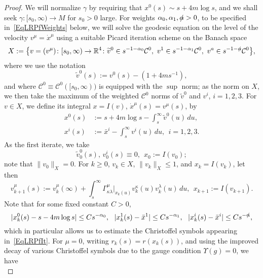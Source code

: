 \documentclass[reqno,11pt,letterpaper]{amsart}
\numberwithin{equation}{section}
\numberwithin{figure}{section}
\theoremstyle{definition}
\theoremstyle{remark}
\newcommand{\mc}{\mathcal}
\newcommand{\cC}{\mc C}
\newcommand{\R}{\mathbb{R}}
\newcommand{\slalpha}{\slashed{\alpha}{}}
\newcommand{\Ups}{\Upsilon}
\newcommand{\wt}{\widetilde}
\begin{document}
\begin{proof}
  We will normalize $\gamma$ by requiring that $x^0(s)\sim s+4 m\log s$, and we shall seek $\gamma\colon[s_0,\infty)\to M$ for $s_0>0$ large. For weights $\alpha_0,\alpha_1,\slalpha>0$, to be specified in~\eqref{EqLRPfWeights} below, we will solve the geodesic equation on the level of the velocity $v^\mu=\dot x^\mu$ using a suitable Picard iteration scheme on the Banach space
  \begin{equation}
  \label{EqLRPfBanach}
    X := \bigl\{ v=(v^\mu)\colon[s_0,\infty)\to\R^4 \colon \wt v^0 \in s^{-1-\alpha_0}\cC^0,\ v^1 \in s^{-1-\alpha_1}\cC^0,\ v^a \in s^{-1-\slalpha}\cC^0 \bigr\},
  \end{equation}
  where we use the notation
  \[
    \wt v^0(s):=v^0(s)-(1+4 m s^{-1}),
  \]
  and where $\cC^0\equiv\cC^0([s_0,\infty))$ is equipped with the $\sup$ norm; as the norm on $X$, we then take the maximum of the weighted $\cC^0$ norms of $\wt v^0$ and $v^i$, $i=1,2,3$. For $v\in X$, we define its integral $x=I(v)$, $\dot x^\mu(s)=v^\mu(s)$, by
  \begin{equation}
  \label{EqLRPfx}
  \begin{split}
    x^0(s) &:= s+4 m\log s - \int_s^\infty \wt v^0(u)\,d u, \\
    x^i(s) &:= \bar x^i - \int_s^\infty v^i(u)\,d u,\ \ i=1,2,3.
  \end{split}
  \end{equation}
  As the first iterate, we take
  \[
    \wt v_0^0(s),\, v_0^i(s)\equiv 0,\ \ 
    x_0:=I(v_0);
  \]
  note that $\|v_0\|_X=0$. For $k\geq 0$, $v_k\in X$, $\|v_k\|_X\leq 1$, and $x_k=I(v_k)$, let then
  \begin{equation}
  \label{EqLRPfIt}
    v^\mu_{k+1}(s) := v_k^\mu(\infty) + \int_s^\infty \Gamma^\mu_{\kappa\lambda}|_{x_k(u)} v_k^\kappa(u)v_k^\lambda(u)\,d u,\ \ 
    x_{k+1} := I(v_{k+1}).
  \end{equation}
  Note that for some fixed constant $C>0$,
  \begin{equation}
  \label{EqLRPfxEst}
    |x_k^0(s)-s-4 m\log s|\leq C s^{-\alpha_0},\ \ 
    |x_k^1(s)-\bar x^1|\leq C s^{-\alpha_1},\ \ 
    |x_k^i(s)-\bar x^i|\leq C s^{-\slalpha},
  \end{equation}
  which in particular allows us to estimate the Christoffel symbols appearing in~\eqref{EqLRPfIt}. For $\mu=0$, writing $r_k(s)=r(x_k(s))$, and using the improved decay of various Christoffel symbols due to the gauge condition $\Ups(g)=0$, we have
  \begin{equation}

\end{equation}
\end{proof}
\end{document}
